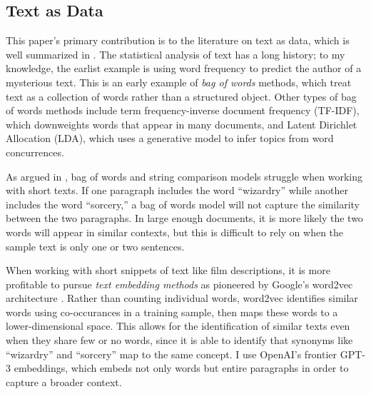 \documentclass{article}
\begin{document}
\subsection{Text as Data}

This paper's primary contribution is to the literature on text as data, which is well summarized in \textcite{gentzkow2019EL}. The statistical analysis of text has a long history; to my knowledge, the earlist example is \textcite{mendenhall1887S} using word frequency to predict the author of a mysterious text. This is an early example of \emph{bag of words} methods, which treat text as a collection of words rather than a structured object. Other types of bag of words methods include term frequency-inverse document frequency (TF-IDF), which downweights words that appear in many documents, and Latent Dirichlet Allocation (LDA), which uses a generative model to infer topics from word concurrences.

As argued in \textcite{kenter2015P2AICIKM}, bag of words and string comparison models struggle when working with short texts. If one paragraph includes the word ``wizardry'' while another includes the word ``sorcery,'' a bag of words model will not capture the similarity between the two paragraphs. In large enough documents, it is more likely the two words will appear in similar contexts, but this is difficult to rely on when the sample text is only one or two sentences. 

When working with short snippets of text like film descriptions, it is more profitable to pursue \emph{text embedding methods} as pioneered by Google's word2vec architecture \parencite{mikolov2013}. Rather than counting individual words, word2vec identifies similar words using co-occurances in a training sample, then maps these words to a lower-dimensional space. This allows for the identification of similar texts even when they share few or no words, since it is able to identify that synonyms like ``wizardry'' and ``sorcery'' map to the same concept. I use OpenAI's frontier GPT-3 embeddings, which embeds not only words but entire paragraphs in order to capture a broader context.

\end{document}
